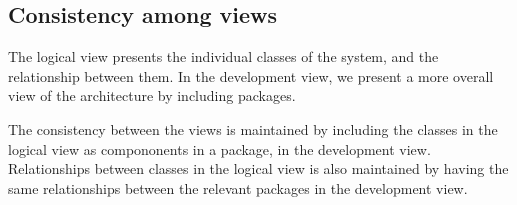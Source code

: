 \subsection{Consistency among views}

The logical view presents the individual classes of the system, and the relationship between them. In the development view, we present a more overall view of the architecture by including packages.

The consistency between the views is maintained by including the classes in the logical view as compononents in a package, in the development view. Relationships between classes in the logical view is also maintained by having the same relationships between the relevant packages in the development view. 
